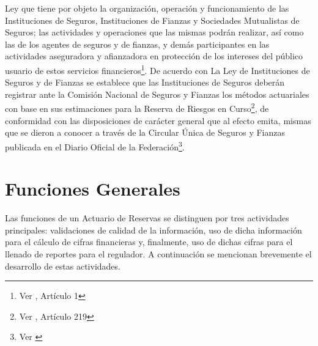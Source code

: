 \documentclass[11pt,twoside,openright,spanish]{report}
\numberwithin{equation}{chapter}
\numberwithin{figure}{chapter}
\numberwithin{table}{chapter}
\begin{document}
	Ley que tiene por objeto la organización, operación y funcionamiento de las Instituciones de Seguros, Instituciones de Fianzas y Sociedades Mutualistas de Seguros; las actividades y operaciones que las mismas podrán realizar, así como las de los agentes de seguros y de fianzas, y demás participantes en las actividades aseguradora y afianzadora en protección de los intereses del público usuario de estos servicios financieros\footnote{Ver \citet{GLisf}, Artículo 1}. De acuerdo con La Ley de Instituciones de Seguros y de Fianzas se establece que las Instituciones de Seguros deberán registrar ante la Comisión Nacional de Seguros y Fianzas los métodos actuariales con base en sus estimaciones para la Reserva de Riesgos en Curso\footnote{Ver \citet{FAmis}, Artículo 219}, de conformidad con las disposiciones de carácter general que al efecto emita, mismas que se dieron a conocer a través de la Circular Única de Seguros y Fianzas publicada en el Diario Oficial de la Federación\footnote{Ver \citet{HCusf}}.
	 
	
	
\chapter{Funciones Generales}\label{cap:Introducción}

Las funciones de un Actuario de Reservas se distinguen por tres actividades principales: validaciones de calidad de la información, uso de dicha información para el cálculo de cifras financieras y, finalmente, uso de dichas cifras para el llenado de reportes para el regulador. A continuación se mencionan brevemente el desarrollo de estas actividades.
\end{document}
